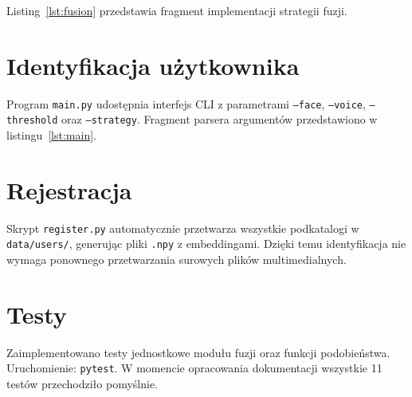 Listing~\ref{lst:fusion} przedstawia fragment implementacji strategii fuzji.



\section{Identyfikacja użytkownika}

Program \texttt{main.py} udostępnia interfejs CLI z parametrami \texttt{--face}, \texttt{--voice}, \texttt{--threshold} oraz \texttt{--strategy}. Fragment parsera argumentów przedstawiono w listingu~\ref{lst:main}.



\section{Rejestracja}

Skrypt \texttt{register.py} automatycznie przetwarza wszystkie podkatalogi w \texttt{data/users/}, generując pliki \texttt{.npy} z embeddingami. Dzięki temu identyfikacja nie wymaga ponownego przetwarzania surowych plików multimedialnych.

\section{Testy}

Zaimplementowano testy jednostkowe modułu fuzji oraz funkcji podobieństwa. Uruchomienie: \texttt{pytest}. W momencie opracowania dokumentacji wszystkie 11 testów przechodziło pomyślnie.
